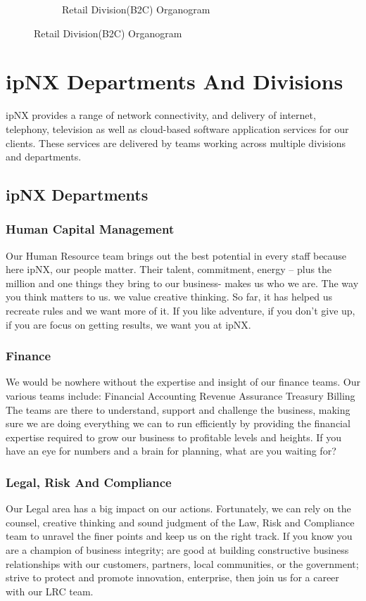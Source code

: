 \begin{figure}[h!]
\begin{subfigure}[b]{0.5\textwidth}
		\caption{Retail Division(B2C) Organogram}
	\end{subfigure}
\end{figure}
\section{ipNX Departments And Divisions}
ipNX provides a range of network connectivity, and delivery of internet, telephony, television as well as cloud-based software application services for our clients. These services are delivered by teams working across multiple divisions and departments.
\subsection{ipNX Departments}
\subsubsection{Human Capital Management}
Our Human Resource team brings out the best potential in every staff because here ipNX, our people matter. Their talent, commitment, energy – plus the million and one things they bring to our business- makes us who we are. The way you think matters to us. we value creative thinking. So far, it has helped us recreate rules and we want more of it. If you like adventure, if you don't give up, if you are focus on getting results, we want you at ipNX.
\subsubsection{Finance}
We would be nowhere without the expertise and insight of our finance teams. Our various teams include: Financial Accounting Revenue Assurance Treasury Billing The teams are there to understand, support and challenge the business, making sure we are doing everything we can to run efficiently by providing the financial expertise required to grow our business to profitable levels and heights. If you have an eye for numbers and a brain for planning, what are you waiting for?
\subsubsection{Legal, Risk And Compliance}
Our Legal area has a big impact on our actions. Fortunately, we can rely on the counsel, creative thinking and sound judgment of the Law, Risk and Compliance team to unravel the finer points and keep us on the right track. If you know you are a champion of business integrity; are good at building constructive business relationships with our customers, partners, local communities, or the government; strive to protect and promote innovation, enterprise, then join us for a career with our LRC team.
